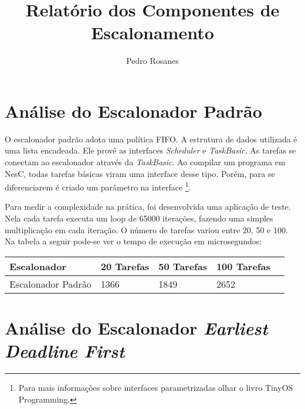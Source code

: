 \documentclass[a4paper,onecolumn, 10pt]{article}
\title{Relatório dos Componentes de Escalonamento}
\author{Pedro Rosanes}
\begin{document}
\maketitle





\section{Análise do Escalonador Padrão}\label{escalonadorpadrao}

O escalonador padrão adota uma política FIFO. A estrutura de dados utilizada é uma lista encadeada.
Ele provê as interfaces \textit{Scheduler} e \textit{TaskBasic}.
As tarefas se conectam ao escalonador através da \textit{TaskBasic}. Ao compilar um programa em NesC, todas tarefas
básicas viram uma interface desse tipo. Porém, para se diferenciarem é criado um parâmetro na interface
\footnote{Para mais informações sobre interfaces parametrizadas olhar o livro TinyOS Programming\cite[s. 8.3 e 9]{tinyosprogramming}.}.

Para medir a complexidade na prática, foi desenvolvida uma aplicação de teste. Nela cada tarefa executa um loop de 65000
iterações, fazendo uma simples multiplicação em cada iteração. O número de tarefas variou entre 20, 50 e 100.
Na tabela a seguir pode-se ver o tempo de execução em microsegundos:
\begin{center}
    \begin{tabular}{ | l | l | l | l | p{5cm} |}
    \hline
    Escalonador              & 20 Tarefas & 50 Tarefas & 100 Tarefas \\ \hline
    Escalonador Padrão       & 1366 & 1849 & 2652 \\ \hline 
    \end{tabular}
\end{center}

\section{Análise do Escalonador \textit{Earliest Deadline First}}\label{escalonadoredf}
\end{document}
